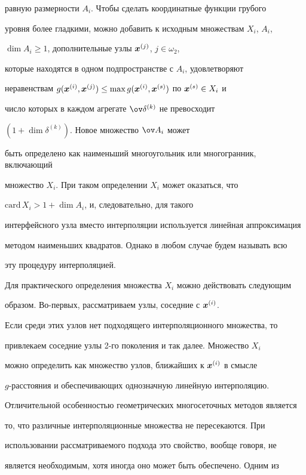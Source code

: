 равную размерности $A_i$. Чтобы сделать координатные функции грубого


уровня более гладкими, можно добавить к исходным множествам $X_i$, $A_i$,


$\dim A_i\ge 1$, дополнительные узлы $\boldsymbol x^{(j)}$, $j\in\omega_2$,


которые находятся в одном подпространстве с $A_i$, удовлетворяют


неравенствам $g(\bi x^{(i)},\bi x^{(j)})\le\max


g(\bi x^{(i)},\bi x^{(s)})$ по $\bi x^{(s)}\in X_i$ и


число которых в каждом агрегате $\ov\delta^{(k)}$ не превосходит


$(1+\dim\delta^{(k)})$. Новое множество $\ov A_i$ может


быть определено как наименьший многоугольник или многогранник, включающий


множество $X_i$. При таком определении $X_i$ может оказаться, что


$\text{card}\,X_i>1+\dim A_i$, и, следовательно, для такого


интерфейсного узла вместо интерполяции используется линейная аппроксимация


методом наименьших квадратов. Однако в любом случае будем называть всю


эту процедуру интерполяцией.





Для практического определения множества $X_i$ можно действовать следующим


образом. Во-первых, рассматриваем узлы, соседние с $\boldsymbol x^{(i)}$.


Если среди этих узлов нет подходящего интерполяционного множества, то


привлекаем соседние узлы 2-го поколения и так далее. Множество $X_i$


можно определить как множество узлов, ближайших к $\boldsymbol x^{(i)}$ в смысле


$g$-расстояния и обеспечивающих однозначную линейную интерполяцию.


Отличительной особенностью геометрических многосеточных методов является


то, что различные интерполяционные множества не пересекаются. При


использовании рассматриваемого подхода это свойство, вообще говоря, не


является необходимым, хотя иногда оно может быть обеспечено. Одним из


